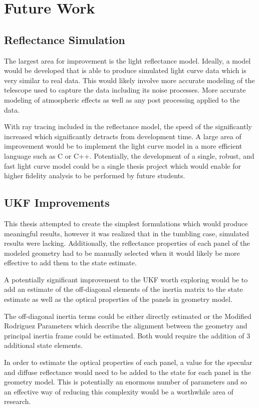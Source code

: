 \chapter{Future Work}

\section{Reflectance Simulation}
The largest area for improvement is the light reflectance model. Ideally, a model would be developed that is able to produce simulated light curve data which is very similar to real data. This would likely involve more accurate modeling of the telescope used to capture the data including its noise processes. More accurate modeling of atmospheric effects as well as any post processing applied to the data. 

With ray tracing included in the reflectance model, the speed of the significantly increased which significantly detracts from development time. A large area of improvement would be to implement the light curve model in a more efficient language such as C or C++. Potentially, the development of a single, robust, and fast light curve model could be a single thesis project which would enable for higher fidelity analysis to be performed by future students.

\section{UKF Improvements}

This thesis attempted to create the simplest formulations which would produce meaningful results, however it was realized that in the tumbling case, simulated results were lacking. Additionally, the reflectance properties of each panel of the modeled geometry had to be manually selected when it would likely be more effective to add them to the state estimate. 

A potentially significant improvement to the UKF worth exploring would be to add an estimate of the off-diagonal elements of the inertia matrix to the state estimate as well as the optical properties of the panels in geometry model.

The off-diagonal inertia terms could be either directly estimated or the Modified Rodriguez Parameters which describe the alignment between the geometry and principal inertia frame could be estimated. Both would require the addition of 3 additional state elements.

In order to estimate the optical properties of each panel, a value for the specular and diffuse reflectance would need to be added to the state for each panel in the geometry model. This is potentially an enormous number of parameters and so an effective way of reducing this complexity would be a worthwhile area of research.

